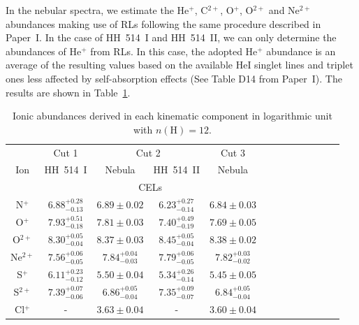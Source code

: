 \documentclass[fleqn,usenatbib]{mnras}
\begin{document}

In the nebular spectra, we estimate the He$^{+}$, C$^{2+}$, O$^{+}$, O$^{2+}$ and Ne$^{2+}$ abundances making use of RLs following the same procedure described in Paper~I. In the case of HH~514~I and HH~514~II, we can  only determine the abundances of He$^{+}$ from RLs. In this case, the adopted He$^{+}$ abundance is an average of the resulting values based on the available He\thinspace I singlet lines and triplet ones less affected by self-absorption effects (See Table D14 from Paper~I). The results are shown in Table~\ref{tab:ionic_abundances}. 

\begin{table}
\centering
\caption{Ionic abundances derived in each kinematic component in logarithmic unit with $n(\text{H})=12$.}
\label{tab:ionic_abundances}
\begin{tabular}{ccccccccccccc}
\hline
 & \multicolumn{1}{c}{Cut 1} & \multicolumn{2}{c}{Cut 2} & \multicolumn{1}{c}{Cut 3} & \\
Ion &  HH~514~I & Nebula & HH~514~II  & Nebula \\
\hline
 & \multicolumn{4}{c}{CELs}\\

N$^{+}$  & $6.88^{+0.28} _{-0.13}$ &$6.89 \pm 0.02 $  & $6.23^{+0.27} _{-0.14}$& $6.84 \pm 0.03 $\\

O$^{+}$ & $7.93^{+0.51} _{-0.18}$ & $7.81 \pm 0.03 $&$7.40^{+0.49} _{-0.19}$ & $7.69 \pm 0.05 $\\ 

O$^{2+}$ & $8.30^{+0.05} _{-0.04}$& $8.37 \pm 0.03$& $8.45^{+0.05} _{-0.04}$ &$8.38 \pm 0.02 $\\

Ne$^{2+}$ & $7.56^{+0.06} _{-0.05}$& $7.84^{+0.04} _{-0.03}$ & $7.79^{+0.06} _{-0.05}$&$7.82^{+0.03} _{-0.02}$\\

S$^{+}$ & $6.11^{+0.23} _{-0.12}$ & $5.50 \pm 0.04 $& $5.34^{+0.26} _{-0.14}$&$5.45 \pm 0.05 $\\

S$^{2+}$ & $7.39^{+0.07} _{-0.06}$ &$6.86^{+0.05} _{-0.04}$ & $7.35^{+0.09} _{-0.07}$&$6.84^{+0.05} _{-0.04}$\\

Cl$^{+}$ & - &$3.63 \pm 0.04 $&- &$3.60 \pm 0.04 $\\


\end{tabular}
\end{table}
\end{document}
